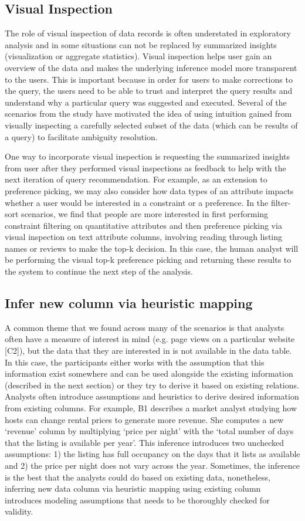 \documentclass{sig-alternate-05-2015}
\begin{document}
\subsection{Visual Inspection}
  The role of visual inspection of data records is often understated in exploratory analysis and in some situations can not be replaced by summarized insights (visualization or aggregate statistics). Visual inspection helps user gain an overview of the data and makes the underlying inference model more transparent to the users. This is important because in order for users to make corrections to the query, the users need to be able to trust and interpret the query results and understand why a particular query was suggested and executed. Several of the scenarios from the study have motivated the idea of using intuition gained from visually inspecting a carefully selected subset of the data (which can be results of a query) to facilitate ambiguity resolution. 
  \par One way to incorporate visual inspection is requesting the summarized insights from user after they performed visual inspections as feedback to help with the next iteration of query recommendation. For example, as an extension to preference picking, we may also consider how data types of an attribute impacts whether a user would be interested in a constraint or a preference. In the filter-sort scenarios, we find that people are more interested in first performing constraint filtering on quantitative attributes and then preference picking via visual inspection on text attribute columns, involving reading through listing names or reviews to make the top-k decision. In this case, the human analyst will be performing the visual top-k preference picking and returning these results to the system to continue the next step of the analysis.
\subsection{Infer new column via heuristic mapping}
 \par A common theme that we found across many of the scenarios is that analysts often have a measure of interest in mind (e.g. page views on a particular website [C2]), but the data that they are interested in is not available in the data table. In this case, the participants either works with the assumption that this information exist somewhere and can be used alongside the existing information (described in the next section) or they try to derive it based on existing relations. Analysts often introduce assumptions and heuristics to derive desired information from existing columns. For example, B1 describes a market analyst studying how hosts can change rental prices to generate more revenue. She computes a new `revenue' column by multiplying `price per night' with the `total number of days that the listing is available per year'. This inference introduces two unchecked assumptions: 1) the listing has full occupancy on the days that it lists as available and 2) the price per night does not vary across the year. Sometimes, the inference is the best that the analysts could do based on existing data, nonetheless, inferring new data column via heuristic mapping using existing column introduces modeling assumptions that needs to be thoroughly checked for validity. 
\end{document}
